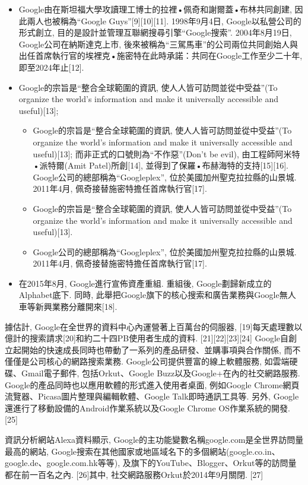 \begin{itemize}
\item Google由在斯坦福大學攻讀理工博士的拉裡•佩奇和謝爾蓋•布林共同創建, 因此兩人也被稱為``Google Guys''[9][10][11]. 1998年9月4日, Google以私營公司的形式創立, 目的是設計並管理互聯網搜尋引擎``Google搜索''. 2004年8月19日, Google公司在納斯達克上市, 後來被稱為``三駕馬車''的公司兩位共同創始人與出任首席執行官的埃裡克•施密特在此時承諾：共同在Google工作至少二十年, 即至2024年止[12].

\item Google的宗旨是``整合全球範圍的資訊, 使人人皆可訪問並從中受益''(To organize the world's information and make it universally accessible and useful)[13];
\begin{itemize}
\item Google的宗旨是``整合全球範圍的資訊, 使人人皆可訪問並從中受益''(To organize the world's information and make it universally accessible and useful)[13]; 而非正式的口號則為``不作惡''(Don't be evil), 由工程師阿米特•派特爾(Amit Patel)所創[14], 並得到了保羅•布赫海特的支持[15][16]. Google公司的總部稱為``Googleplex'', 位於美國加州聖克拉拉縣的山景城. 2011年4月, 佩奇接替施密特擔任首席執行官[17].
\item Google的宗旨是``整合全球範圍的資訊, 使人人皆可訪問並從中受益''(To organize the world's information and make it universally accessible and useful)[13].
\item Google公司的總部稱為``Googleplex'', 位於美國加州聖克拉拉縣的山景城. 2011年4月, 佩奇接替施密特擔任首席執行官[17].
\end{itemize}

\item 在2015年8月, Google進行宣佈資產重組. 重組後, Google劃歸新成立的Alphabet底下. 同時, 此舉把Google旗下的核心搜索和廣告業務與Google無人車等新興業務分離開來[18]. 
\end{itemize}

據估計, Google在全世界的資料中心內運營著上百萬台的伺服器, [19]每天處理數以億計的搜索請求[20]和約二十四PB使用者生成的資料. [21][22][23][24] Google自創立起開始的快速成長同時也帶動了一系列的產品研發、並購事項與合作關係, 而不僅僅是公司核心的網路搜索業務. Google公司提供豐富的線上軟體服務, 如雲端硬碟、Gmail電子郵件, 包括Orkut、Google Buzz以及Google+在內的社交網路服務. Google的產品同時也以應用軟體的形式進入使用者桌面, 例如Google Chrome網頁流覽器、Picasa圖片整理與編輯軟體、Google Talk即時通訊工具等. 另外, Google還進行了移動設備的Android作業系統以及Google Chrome OS作業系統的開發. [25]

資訊分析網站Alexa資料顯示, Google的主功能變數名稱google.com是全世界訪問量最高的網站, Google搜索在其他國家或地區域名下的多個網站(google.co.in、google.de、google.com.hk等等), 及旗下的YouTube、Blogger、Orkut等的訪問量都在前一百名之內. [26]其中, 社交網路服務Orkut於2014年9月關閉. [27]


